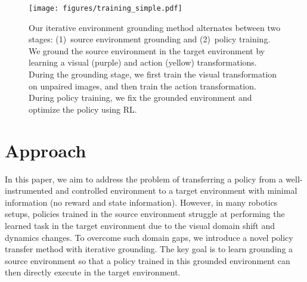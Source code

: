 \begin{figure*}[t]
    \centering
    \texttt{[image: figures/training\_simple.pdf]}
    \caption{
        Our iterative environment grounding method alternates between two stages: (1)~source environment grounding and (2)~policy training. We ground the source environment in the target environment by learning a visual (purple) and action (yellow) transformations. During the grounding stage, we first train the visual transformation on unpaired images, and then train the action transformation.  During policy training, we fix the grounded environment and optimize the policy using RL.
    }
    \label{fig:training}
\end{figure*}


\section{Approach}

In this paper, we aim to address the problem of transferring a policy from a well-instrumented and controlled environment to a target environment with minimal information (\ie no reward and state information). However, in many robotics setups, policies trained in the source environment struggle at performing the learned task in the target environment due to the visual domain shift and dynamics changes. To overcome such domain gaps, we introduce a novel policy transfer method with iterative grounding. The key goal is to learn grounding a source environment so that a policy trained in this grounded environment can then directly execute in the target environment.



